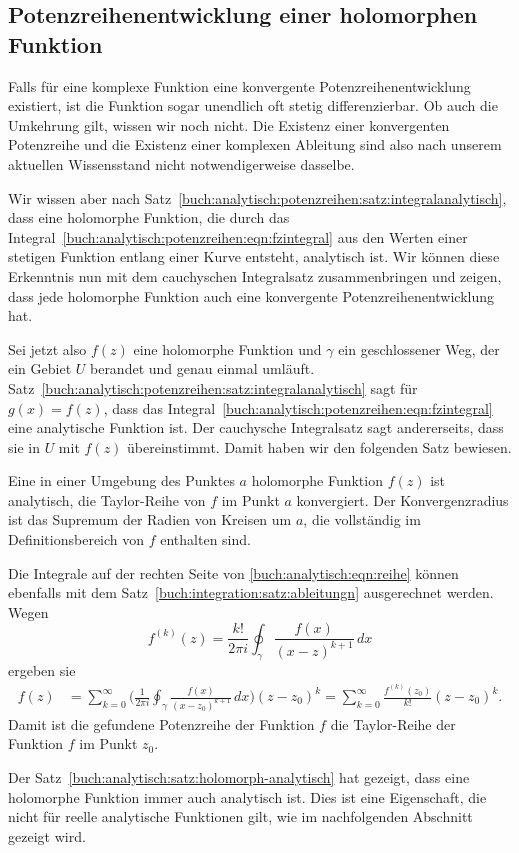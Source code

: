 %
%
%
\subsection{Potenzreihenentwicklung einer holomorphen Funktion
\label{buch:analytisch:potenzreihen:subsection:analytisch}}
Falls für eine komplexe Funktion eine konvergente Potenzreihenentwicklung
existiert, ist die Funktion sogar unendlich oft stetig differenzierbar.
Ob auch die Umkehrung gilt, wissen wir noch nicht.
Die Existenz einer konvergenten Potenzreihe und die Existenz einer
komplexen Ableitung sind also nach unserem aktuellen Wissensstand
nicht notwendigerweise dasselbe.

Wir wissen aber nach
Satz~\ref{buch:analytisch:potenzreihen:satz:integralanalytisch},
dass eine holomorphe Funktion, die durch das
Integral~\eqref{buch:analytisch:potenzreihen:eqn:fzintegral}
aus den Werten einer stetigen Funktion entlang einer Kurve
entsteht, analytisch ist.
Wir können diese Erkenntnis nun mit dem cauchyschen Integralsatz
zusammenbringen und zeigen, dass jede holomorphe Funktion auch
eine konvergente Potenzreihenentwicklung hat.

Sei jetzt also $f(z)$ eine holomorphe Funktion und $\gamma$ ein
geschlossener Weg, der ein Gebiet $U$ berandet und genau einmal
umläuft.
Satz~\ref{buch:analytisch:potenzreihen:satz:integralanalytisch}
sagt für $g(x)=f(z)$, dass das
Integral~\eqref{buch:analytisch:potenzreihen:eqn:fzintegral}
eine analytische Funktion ist.
Der cauchysche Integralsatz sagt andererseits, dass sie in $U$ mit
$f(z)$ übereinstimmt.
Damit haben wir den folgenden Satz bewiesen.

\begin{satz}
\label{buch:analytisch:satz:holomorph-analytisch}
Eine in einer Umgebung des Punktes $a$ holomorphe Funktion $f(z)$
ist analytisch, die Taylor-Reihe
von $f$ im Punkt $a$ konvergiert.
Der Konvergenzradius ist das Supremum der Radien von Kreisen um $a$,
die vollständig im Definitionsbereich von $f$ enthalten sind.
\end{satz}

Die Integrale auf der rechten Seite von \eqref{buch:analytisch:eqn:reihe}
können ebenfalls mit dem Satz~\ref{buch:integration:satz:ableitungn}
ausgerechnet werden.
Wegen
\[
f^{(k)}(z)
=
\frac{k!}{2\pi i}
\oint_\gamma
\frac{f(x)}{(x-z)^{k+1}}
\,dx
\]
ergeben sie
\begin{align*}
f(z)
&=
\sum_{k=0}^{\infty}
\biggl(
\frac{1}{2\pi i}
\oint_\gamma
\frac{f(x)}
{(x-z_0)^{k+1}}
\,dx
\biggr)
(z-z_0)^k
=
\sum_{k=0}^\infty
\frac{f^{(k)}(z_0)}{k!}
(z-z_0)^k.
\end{align*}
Damit ist die gefundene Potenzreihe der Funktion $f$ die
Taylor-Reihe der Funktion $f$ im Punkt $z_0$.

Der Satz~\ref{buch:analytisch:satz:holomorph-analytisch}
hat gezeigt, dass eine holomorphe Funktion immer auch
analytisch ist.
Dies ist eine Eigenschaft, die nicht für reelle analytische
Funktionen gilt, wie im nachfolgenden Abschnitt gezeigt wird.
